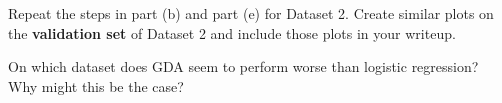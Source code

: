\item {}
Repeat the steps in part (b) and part (e) for Dataset 2. Create similar plots on
the \textbf{validation set} of Dataset 2 and include those plots in your writeup.

On which dataset does GDA seem to
perform worse than logistic regression? Why might this be the case?

